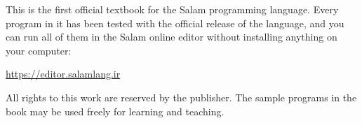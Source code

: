 \documentclass[11pt,openany]{book}
\makeatletter
\newcounter{program}[chapter]
\newcommand{\beginappendices}{\clearpage
  \setcounter{chapter}{0}\setcounter{section}{0}%
  \gdef\@chapapp{\appendixname}%
  \renewcommand{\thechapter}{\Alph{chapter}}%
  \renewcommand{\theHchapter}{app.\arabic{chapter}}%
  \renewcommand{\theHsection}{app.\arabic{chapter}.\arabic{section}}}
\makeatother
\begin{document}
\vspace{0.8cm}
\noindent{}

\vspace{1.5cm}
\noindent\small
This is the first official textbook for the Salam programming language.
Every program in it has been tested with the official release of the
language, and you can run all of them in the Salam online editor without
installing anything on your computer:
\begin{center}
\url{https://editor.salamlang.ir}
\end{center}
\noindent All rights to this work are reserved by the publisher. The sample
programs in the book may be used freely for learning and teaching.
\normalsize
\clearpage



\tableofcontents
\clearpage

\mainmatter











\beginappendices




\end{document}
